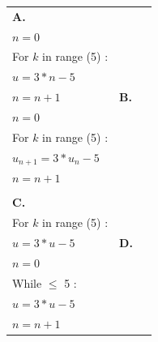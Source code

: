 \documentclass[10pt]{article}
\begin{document}
\begin{tabularx}{\linewidth}{*{2}{X}}
\textbf{A.~~}
\fbox{
\begin{minipage}[t]{3cm}
$u=4$ \\
$n=0$\\
For $k$ in range (5) :\\
\hspace*{0.3cm}$u=3*n-5$\\
\hspace*{0.3cm}$n=n+1$
\end{minipage}}&
\textbf{B.~~} \fbox{
\begin{minipage}[t]{3cm}
 $u=4$\\
 $n=0$ \\
 For $k$ in range (5) :\\
\hspace*{0.3cm}$u_{n+1}=3*u_n-5$\\
\hspace*{0.3cm}$n=n+1$
 \end{minipage}}\\
 &\\
\textbf{C.~~}\fbox{\begin{minipage}[t]{3cm}
$u=4$ \\
For $k$ in range (5) :\\
\hspace*{0.3cm}$u=3*u-5$
\end{minipage}}&
\textbf{D.~~}\fbox{\begin{minipage}[t]{3cm}
$u=4$\\
$n=0$\\
While $\leqslant$ 5 :\\
\hspace*{0.3cm}$u=3*u-5$\\
\hspace*{0.3cm}$n=n+1$
\end{minipage}}
\end{tabularx}

\vspace{1cm}
\end{document}
